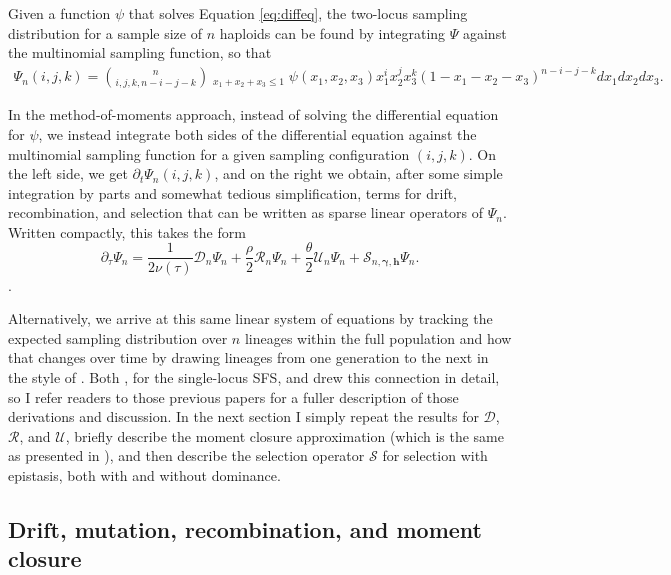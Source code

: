 \documentclass[]{article}
\begin{document}
Given a function \(\psi\) that solves Equation \ref{eq:diffeq}, the two-locus
sampling distribution for a sample size of \(n\) haploids can be found by
integrating \(\Psi\) against the multinomial sampling function, so that
\begin{align} \label{eq:multinomial}
\Psi_n(i, j, k) =
{n \choose{i, j, k, n-i-j-k}}
\mathop{\mathop{\int\int\int}_{x_1, x_2, x_3 \geq0}}_{x_1+x_2+x_3\leq1}
\psi(x_1, x_2, x_3) x_1^i x_2^j x_3^k (1-x_1-x_2-x_3)^{n-i-j-k}
dx_1 dx_2 dx_3.
\end{align}

In the method-of-moments approach, instead of solving the differential equation
for \(\psi\), we instead integrate both sides of the differential equation
against the multinomial sampling function for a given sampling configuration
\((i, j, k)\). On the left side, we get \(\partial_t \Psi_n(i, j, k)\), and on the
right we obtain, after some simple integration by parts and somewhat tedious
simplification, terms for drift, recombination, and selection that can be
written as sparse linear operators of \(\Psi_n\). Written compactly, this takes
the form
\begin{equation}
\partial_\tau \Psi_n =
\frac{1}{2\nu(\tau)}\mathcal{D}_{n}\Psi_n
+ \frac{\rho}{2}\mathcal{R}_{n}\Psi_n
+ \frac{\theta}{2}\mathcal{U}_{n}\Psi_n
+ \mathcal{S}_{n, \boldsymbol{\gamma}, \mathbf{h}}\Psi_n.
\end{equation}.

Alternatively, we arrive at this same linear system of equations by tracking
the expected sampling distribution over \(n\) lineages within the full population
and how that changes over time by drawing lineages from one generation to the
next in the style of \citet{Wright1931-wy}. Both \citet{Jouganous2017-pq}, for the
single-locus SFS, and \citet{Ragsdale2019-nt} drew this connection in detail, so I
refer readers to those previous papers for a fuller description of those
derivations and discussion. In the next section I simply repeat the results for
\(\mathcal{D}\), \(\mathcal{R}\), and \(\mathcal{U}\), briefly describe the moment
closure approximation (which is the same as presented in \citet{Ragsdale2019-nt}), and
then describe the selection operator \(\mathcal{S}\) for selection with
epistasis, both with and without dominance.

\subsection{Drift, mutation, recombination, and moment closure}\label{drift-mutation-recombination-and-moment-closure}
\end{document}
